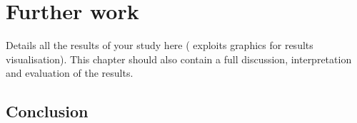 
\chapter{Further work}
\label{chap:furtherwork}
\ifpdf
    \graphicspath{{Algorithms/Figures/PNG/}{EvaluationTask/Figures/PDF/}{Algorithms/Figures/}}
\else
    \graphicspath{{Algorithms/Figures/EPS/}{EvaluationTask/Figures/}}
\fi


Details all the results of your study here ( exploits graphics for results visualisation). 
This chapter should also contain a full discussion, interpretation and evaluation of the results. 


\section{Conclusion}
\label{sec:conclusion}



